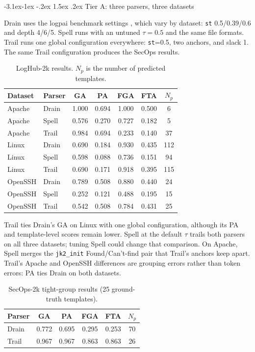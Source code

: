 \documentclass[11pt]{article}
\makeatletter
\renewcommand\subsection{\@startsection{subsection}{2}{\z@}%
  {-3.1ex\@plus -1ex \@minus -.2ex}%
  {1.5ex \@plus .2ex}%
  {\normalfont\large\bfseries}}
\makeatother
\begin{document}
\subsection{Tier A: three parsers, three datasets}

Drain uses the logpai benchmark settings \cite{he2017}, which vary by
dataset: \texttt{st} 0.5/0.39/0.6 and depth 4/6/5. Spell runs with an
untuned $\tau=0.5$ \cite{du2016} and the same file formats. Trail runs
one global configuration everywhere: \texttt{st}=0.5, two anchors,
and slack 1. The same Trail configuration produces the SecOps results.

\begin{table}[H]
\centering
\small
\setlength{\tabcolsep}{4pt}
\caption{LogHub-2k results. $N_p$ is the number of predicted templates.}
\label{tab:tiera}
\begin{tabular}{llccccc}
\toprule
Dataset & Parser & GA & PA & FGA & FTA & $N_p$ \\
\midrule
Apache & Drain & 1.000 & 0.694 & 1.000 & 0.500 & 6 \\
Apache & Spell & 0.576 & 0.270 & 0.727 & 0.182 & 5 \\
Apache & Trail & 0.984 & 0.694 & 0.233 & 0.140 & 37 \\
\midrule
Linux & Drain & 0.690 & 0.184 & 0.930 & 0.435 & 112 \\
Linux & Spell & 0.598 & 0.088 & 0.736 & 0.151 & 94 \\
Linux & Trail & 0.690 & 0.171 & 0.918 & 0.395 & 115 \\
\midrule
OpenSSH & Drain & 0.789 & 0.508 & 0.880 & 0.440 & 24 \\
OpenSSH & Spell & 0.252 & 0.121 & 0.488 & 0.195 & 15 \\
OpenSSH & Trail & 0.542 & 0.508 & 0.784 & 0.431 & 25 \\
\bottomrule
\end{tabular}
\end{table}

Trail ties Drain's GA on Linux with one global configuration, although
its PA and template-level scores remain lower. Spell at the default
$\tau$ trails both parsers on all three datasets; tuning Spell could
change that comparison. On Apache, Spell merges the
\texttt{jk2\_init} Found/Can't-find pair that Trail's anchors keep
apart. Trail's Apache and OpenSSH differences are grouping errors
rather than token errors: PA ties Drain on both datasets.

\begin{table}[H]
\centering
\small
\caption{SecOps-2k tight-group results (25 ground-truth templates).}
\label{tab:secops}
\begin{tabular}{lccccc}
\toprule
Parser & GA & PA & FGA & FTA & $N_p$ \\
\midrule
Drain & 0.772 & 0.695 & 0.295 & 0.253 & 70 \\
Trail & 0.967 & 0.967 & 0.863 & 0.863 & 26 \\
\bottomrule
\end{tabular}
\end{table}
\end{document}
